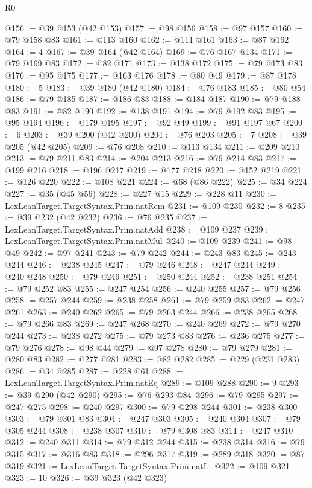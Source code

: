 \begin{lexlean}{R0}
\begin{coremodule}
@156 := @39 @153 (@42 @153)
@157 := @98 @156
@158 := @97 @157
@160 := @79 @158 @83
@161 := @113 @160
@162 := @111 @161
@163 := @87 @162
@164 := 4
@167 := @39 @164 (@42 @164)
@169 := @76 @167 @134
@171 := @79 @169 @83
@172 := @82 @171
@173 := @138 @172
@175 := @79 @173 @83
@176 := @95 @175
@177 := @163 @176
@178 := @80 @49
@179 := @87 @178
@180 := 5
@183 := @39 @180 (@42 @180)
@184 := @76 @183
@185 := @80 @54
@186 := @79 @185
@187 := @186 @83
@188 := @184 @187
@190 := @79 @188 @83
@191 := @82 @190
@192 := @138 @191
@194 := @79 @192 @83
@195 := @95 @194
@196 := @179 @195
@197 := @92 @49
@199 := @91 @197 @67
@200 := 6
@203 := @39 @200 (@42 @200)
@204 := @76 @203
@205 := 7
@208 := @39 @205 (@42 @205)
@209 := @76 @208
@210 := @113 @134
@211 := @209 @210
@213 := @79 @211 @83
@214 := @204 @213
@216 := @79 @214 @83
@217 := @199 @216
@218 := @196 @217
@219 := @177 @218
@220 := @152 @219
@221 := @126 @220
@222 := @108 @221
@224 := @68 (@86 @222)
@225 := @34 @224
@227 := @35 (@45 @56)
@228 := @227 @15
@229 := @228 @11
@230 := LexLeanTarget.TargetSyntax.Prim.natRem
@231 := @109 @230
@232 := 8
@235 := @39 @232 (@42 @232)
@236 := @76 @235
@237 := LexLeanTarget.TargetSyntax.Prim.natAdd
@238 := @109 @237
@239 := LexLeanTarget.TargetSyntax.Prim.natMul
@240 := @109 @239
@241 := @98 @49
@242 := @97 @241
@243 := @79 @242
@244 := @243 @83
@245 := @243 @244
@246 := @238 @245
@247 := @79 @246
@248 := @247 @244
@249 := @240 @248
@250 := @79 @249
@251 := @250 @244
@252 := @238 @251
@254 := @79 @252 @83
@255 := @247 @254
@256 := @240 @255
@257 := @79 @256
@258 := @257 @244
@259 := @238 @258
@261 := @79 @259 @83
@262 := @247 @261
@263 := @240 @262
@265 := @79 @263 @244
@266 := @238 @265
@268 := @79 @266 @83
@269 := @247 @268
@270 := @240 @269
@272 := @79 @270 @244
@273 := @238 @272
@275 := @79 @273 @83
@276 := @236 @275
@277 := @79 @276
@278 := @98 @44
@279 := @97 @278
@280 := @79 @279
@281 := @280 @83
@282 := @277 @281
@283 := @82 @282
@285 := @229 (@231 @283)
@286 := @34 @285
@287 := @228 @61
@288 := LexLeanTarget.TargetSyntax.Prim.natEq
@289 := @109 @288
@290 := 9
@293 := @39 @290 (@42 @290)
@295 := @76 @293 @84
@296 := @79 @295
@297 := @247 @275
@298 := @240 @297
@300 := @79 @298 @244
@301 := @238 @300
@303 := @79 @301 @83
@304 := @247 @303
@305 := @240 @304
@307 := @79 @305 @244
@308 := @238 @307
@310 := @79 @308 @83
@311 := @247 @310
@312 := @240 @311
@314 := @79 @312 @244
@315 := @238 @314
@316 := @79 @315
@317 := @316 @83
@318 := @296 @317
@319 := @289 @318
@320 := @87 @319
@321 := LexLeanTarget.TargetSyntax.Prim.natLt
@322 := @109 @321
@323 := 10
@326 := @39 @323 (@42 @323)

\end{coremodule}
\end{lexlean}

